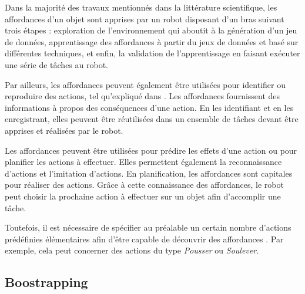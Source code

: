 \documentclass{llncs}
\begin{document}
Dans la majorité des travaux mentionnés dans la littérature scientifique, les affordances d'un objet sont apprises par un robot disposant d'un bras suivant trois étapes : exploration de l'environnement qui aboutit à la génération d'un jeu de données, apprentissage des affordances à partir du jeux de données et basé sur différentes techniques, et enfin, la validation de l'apprentissage en faisant exécuter une série de tâches au robot.

Par ailleurs, les affordances peuvent également être utilisées pour identifier ou reproduire des actions, tel qu'expliqué dans \cite{4399517}.
Les affordances fournissent des informations à propos des conséquences d'une action.
En les identifiant et en les enregistrant, elles peuvent être réutilisées dans un ensemble de tâches devant être apprises et réalisées par le robot.

Les affordances peuvent être utilisées pour prédire les effets d'une action ou pour planifier les actions à effectuer.
Elles permettent également la reconnaissance d'actions et l'imitation d'actions.
En planification, les affordances sont capitales pour réaliser des actions.
Grâce à cette connaissance des affordances, le robot peut choisir la prochaine action à effectuer sur un objet afin d'accomplir une tâche.

Toutefois, il est nécessaire de spécifier au préalable un certain nombre d'actions prédéfinies élémentaires afin d'être capable de découvrir des affordances \cite{Montesano2008}.
Par exemple, cela peut concerner des actions du type \textit{Pousser} ou \mbox{\textit{Soulever}}.





\subsection{Boostrapping}
\end{document}
